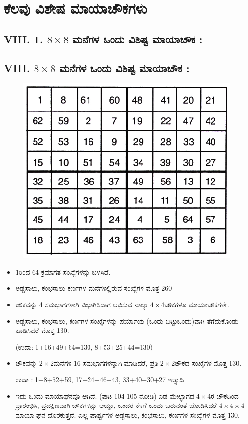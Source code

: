 \chapter{ಕೆಲವು ವಿಶೇಷ ಮಾಯಾಚೌಕಗಳು}

\section*{VIII. 1. $8 \times 8$ ಮನೆಗಳ ಒಂದು ವಿಶಿಷ್ಟ ಮಾಯಾಚೌಕ :}

\section*{VIII. $8 \times 8$ ಮನೆಗಳ ಒಂದು ವಿಶಿಷ್ಟ ಮಾಯಾಚೌಕ :}
\begin{figure}[H]
\includegraphics[scale=.85]{src/figures/chap7/fig7-1.jpg}
\end{figure}

\begin{itemize}
	\item 1ರಿಂದ 64 ಕ್ರಮಾಗತ ಸಂಖ್ಯೆಗಳನ್ನು ಬಳಸಿದೆ.
	\item ಅಡ್ಡಸಾಲು, ಕಂಭಸಾಲು ಕರ್ಣಗಳ ಮನೆಗಳಲ್ಲಿರುವ ಸಂಖ್ಯೆಗಳ ಮೊತ್ತ 260
	\item ಚೌಕವನ್ನು 4 ಸಮಭಾಗಗಳಾಗಿ ವಿಭಾಗಿಸಿದಾಗ ಲಭಿಸುವ ನಾಲ್ಕು $4 \times 4$ಚೌಕಗಳೂ ಮಾಯಾಚೌಕಗಳೇ.
	\item ಅಡ್ಡಸಾಲು, ಕಂಭಸಾಲು, ಕರ್ಣಗಳ ಸಂಖ್ಯೆಗಳನ್ನು ಪರ್ಯಾಯ (ಒಂದು ಬಿಟ್ಟು\break ಒಂದು)ವಾಗಿ ತೆಗೆದುಕೊಂಡು ಕೂಡಿಸಿದರೆ ಮೊತ್ತ 130.
	
	 (ಉದಾ: 1+16+49+64=130, 8+53+25+44=130)
	\item ಚೌಕವನ್ನು $2 \times 2$ಮನೆಗಳ 16 ಸಮಭಾಗಗಳನ್ನಾಗಿ ಮಾಡಿದರೆ, ಪ್ರತಿ $2 \times 2$ಚೌಕದ ಸಂಖ್ಯೆಗಳ ಮೊತ್ತ 130.

	ಉದಾ : 1+8+62+59, 17+24+46+43, 33+40+30+27 ಇತ್ಯಾದಿ
	\item ಇದು ಒಂದು ಮಾಯಾಘನವೂ ಆಗಿದೆ. (ಪುಟ 104-105 ನೋಡಿ) ಎಡ \hbox{ಮೇಲ್ಭಾಗದ} $4 \times 4$ರ ಚೌಕದಿಂದ ಪ್ರಾರಂಭಿಸಿ, ಪ್ರದಕ್ಷಿಣವಾಗಿ ಚೌಕಗಳನ್ನು ಆಯ್ದು, ಒಂದರ ಕೆಳಗೆ ಒಂದು ಬರುವಂತೆ ಜೋಡಿಸಿದರೆ $4 \times 4 \times 4$ ಮಾಯಾ ಘನ ದೊರಕು\-ತ್ತದೆ. ಎಲ್ಲ ಪಾರ್ಶ್ವಗಳ ಅಡ್ಡಸಾಲು, ಕಂಭಸಾಲು, ಕರ್ಣಗಳ ಸಂಖ್ಯೆಗಳ ಮೊತ್ತ 130.
\end{itemize}

